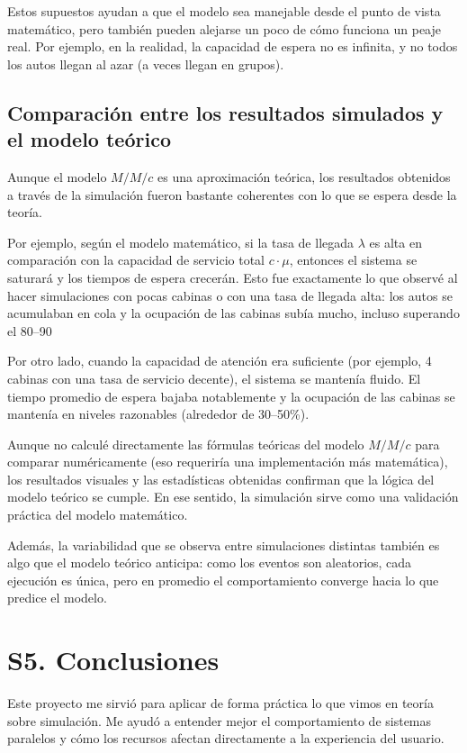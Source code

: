 \documentclass[12pt]{article}
\begin{document}
Estos supuestos ayudan a que el modelo sea manejable desde el punto de vista matemático, pero también pueden alejarse un poco de cómo funciona un peaje real. Por ejemplo, en la realidad, la capacidad de espera no es infinita, y no todos los autos llegan al azar (a veces llegan en grupos).

\subsection*{Comparación entre los resultados simulados y el modelo teórico}

Aunque el modelo $M/M/c$ es una aproximación teórica, los resultados obtenidos a través de la simulación fueron bastante coherentes con lo que se espera desde la teoría.

Por ejemplo, según el modelo matemático, si la tasa de llegada $\lambda$ es alta en comparación con la capacidad de servicio total $c \cdot \mu$, entonces el sistema se saturará y los tiempos de espera crecerán. Esto fue exactamente lo que observé al hacer simulaciones con pocas cabinas o con una tasa de llegada alta: los autos se acumulaban en cola y la ocupación de las cabinas subía mucho, incluso superando el 80–90%

Por otro lado, cuando la capacidad de atención era suficiente (por ejemplo, 4 cabinas con una tasa de servicio decente), el sistema se mantenía fluido. El tiempo promedio de espera bajaba notablemente y la ocupación de las cabinas se mantenía en niveles razonables (alrededor de 30–50\%).

Aunque no calculé directamente las fórmulas teóricas del modelo $M/M/c$ para comparar numéricamente (eso requeriría una implementación más matemática), los resultados visuales y las estadísticas obtenidas confirman que la lógica del modelo teórico se cumple. En ese sentido, la simulación sirve como una validación práctica del modelo matemático.

Además, la variabilidad que se observa entre simulaciones distintas también es algo que el modelo teórico anticipa: como los eventos son aleatorios, cada ejecución es única, pero en promedio el comportamiento converge hacia lo que predice el modelo.


\section*{S5. Conclusiones}

Este proyecto me sirvió para aplicar de forma práctica lo que vimos en teoría sobre simulación. Me ayudó a entender mejor el comportamiento de sistemas paralelos y cómo los recursos afectan directamente a la experiencia del usuario.
\end{document}
